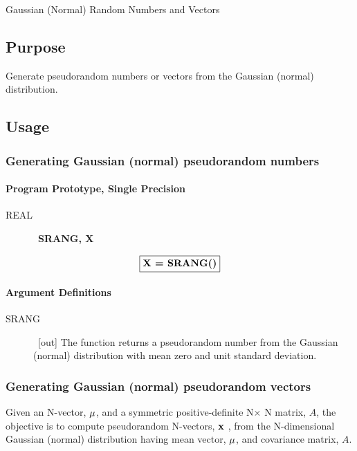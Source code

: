 \documentclass[twoside]{MATH77}
\begin{document}
 Gaussian (Normal) Random Numbers and Vectors


\subsection{Purpose}

Generate pseudorandom numbers or vectors from the Gaussian (normal)
distribution.

\subsection{Usage}

\subsubsection{Generating Gaussian (normal) pseudorandom numbers}

\paragraph{Program Prototype, Single Precision}

\begin{description}
\item[REAL]  \ {\bf SRANG, X}
\end{description}
$$
\fbox{{\bf X = SRANG()}}
$$
\paragraph{Argument Definitions}

\begin{description}
\item[SRANG]  \ [out] The function returns a pseudorandom number from the
Gaussian (normal) distribution with mean zero and unit standard deviation.
\end{description}

\subsubsection{Generating Gaussian (normal) pseudorandom vectors}

Given an N-vector, ${\bf \mu }$, and a symmetric positive-definite N$\times $%
N matrix, $A$, the objective is to compute pseudorandom N-vectors, ${\bf x}$%
, from the N-dimensional Gaussian (normal) distribution having mean vector, $%
{\bf \mu }$, and covariance matrix, $A$.
\end{document}
